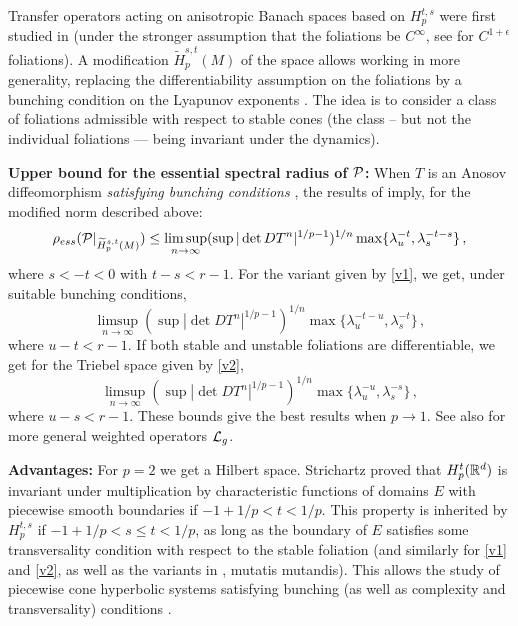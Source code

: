 \documentclass[10pt,twoside]{amsart}
\begin{document}
Transfer operators acting
on anisotropic Banach spaces
based on $H^{t,s}_p$ were first studied  in
\cite{BCinfty} (under the stronger assumption that the foliations be $C^\infty$, see
\cite{BG1} for  $C^{1+\epsilon}$ foliations). 
A modification 
$\widetilde H^{s,t}_p(M)$ of the 
space allows working in more generality,
replacing the differentiability assumption on the foliations
by a bunching condition on the Lyapunov exponents \cite{BG2, BLiv}. 
The idea is to consider  a class of  foliations admissible
with respect to stable cones (the class -- but not the individual foliations --- being invariant under the
dynamics).

\medskip

{\bf Upper bound for the essential spectral radius of $\mathcal {P}$:}
When $T$ is an Anosov diffeomorphism {\it satisfying bunching conditions} \cite[(2.3)--(2.4)]{BG2},
the results of \cite{BG1,BG2} imply, for the modified norm described above:
$$
\rho_{ess}(\mathcal {P}|_{\widetilde H^{s,t}_p(M)})\le \limsup_{n \to \infty} (\sup|\det DT^{n}|^{1/p-1})^{1/n}
  \max\{\lambda_{u}^{-t},\lambda_{s}^{-t-s}\}\, ,
$$
where $s<-t<0$ with $t-s<r-1$.
 For the variant given by  \eqref{v1}, we get, under suitable bunching conditions, 
$$\limsup_{n \to \infty} (\sup|\det DT^{n}|^{1/p-1})^{1/n}
  \max\{\lambda_{u}^{-t-u},\lambda_{s}^{-t}\}\, , $$ 
where $u-t<r-1$.
If both stable and unstable foliations are differentiable,
we get for the Triebel space given by \eqref{v2}, 
$$\limsup_{n \to \infty} (\sup|\det DT^{n}|^{1/p-1})^{1/n}
  \max\{\lambda_{u}^{-u},\lambda_{s}^{-s}\}\, , $$ where $u-s<r-1$.
These bounds give the best results when $p\to 1$.
See also \cite{BG1,BG2,Ba} for more general weighted operators $\mathcal{L}_g$.

\smallskip

{\bf Advantages:}
For $p=2$ we get a Hilbert space.
Strichartz proved  \cite{Str}  that
$H^t_p(\mathbb{R}^d)$ is invariant under multiplication by characteristic functions
of  domains $E$ 
with piecewise smooth boundaries if  $-1+1/p<t<1/p$. 
This property is inherited  \cite{BG1} by $H^{t,s}_p$  if
$-1+1/p<s\le t<1/p$, as long as the boundary of $E$
satisfies some transversality condition with respect to 
the stable foliation (and similarly for \eqref{v1}  and \eqref{v2},
as well as the
variants in \cite{BG2,BLiv}, mutatis mutandis). This allows the study of
piecewise cone hyperbolic systems satisfying bunching 
(as well  as complexity and transversality) conditions
\cite{BG1,BG2,BLiv}.

\smallskip
\end{document}
